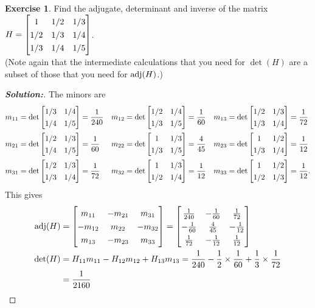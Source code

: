 \documentclass[a4paper]{amsart}
\theoremstyle{definition}
\newtheorem{exercise}{Exercise}
\newenvironment{solution}{\begin{proof}[\textbf{Solution:}] \vphantom{u}}{\end{proof}}
\begin{document}
\begin{exercise}\label{ex-adjugate-hilbert}
 Find the adjugate, determinant and inverse of the matrix
 $H=\bbm 1&1/2&1/3 \\ 1/2&1/3&1/4 \\ 1/3&1/4&1/5 \ebm$.  \\
 (Note again that the intermediate calculations that you need for
 $\det(H)$ are a subset of those that you need for $\operatorname{adj}(H)$.)
\end{exercise}
\begin{solution}
 The minors are 
 \begin{align*}
  m_{11} &= \det\bbm 1/3&1/4 \\ 1/4&1/5 \ebm = \frac{1}{240} &
  m_{12} &= \det\bbm 1/2&1/4 \\ 1/3&1/5 \ebm = \frac{1}{60} &
  m_{13} &= \det\bbm 1/2&1/3 \\ 1/3&1/4 \ebm = \frac{1}{72} \\
  m_{21} &= \det\bbm 1/2&1/3 \\ 1/4&1/5 \ebm = \frac{1}{60} &
  m_{22} &= \det\bbm 1  &1/3 \\ 1/3&1/5 \ebm = \frac{4}{45} &
  m_{23} &= \det\bbm 1  &1/2 \\ 1/3&1/4 \ebm = \frac{1}{12} \\
  m_{31} &= \det\bbm 1/2&1/3 \\ 1/3&1/4 \ebm = \frac{1}{72} &
  m_{32} &= \det\bbm 1  &1/3 \\ 1/2&1/4 \ebm = \frac{1}{12} &
  m_{33} &= \det\bbm 1  &1/2 \\ 1/2&1/3 \ebm = \frac{1}{12}.
 \end{align*}
 This gives
 \begin{align*} 
  \adj(H) &= \bbm  m_{11} & -m_{21} &  m_{31} \\
                  -m_{12} &  m_{22} & -m_{32} \\
                   m_{13} & -m_{23} &  m_{33} \ebm 
           = \renewcommand{\arraystretch}{1.3} \bbm 
                   \frac{1}{240} & -\frac{1}{60} & \frac{1}{72} \\
                  -\frac{1}{60} &  \frac{4}{45} & -\frac{1}{12} \\
                   \frac{1}{72} & -\frac{1}{12} &  \frac{1}{12} \ebm
                   \\
  \det(H) &= H_{11}m_{11} - H_{12}m_{12} + H_{13}m_{13} 
           = \frac{1}{240} - \frac{1}{2}\tm\frac{1}{60} +
             \frac{1}{3}\tm\frac{1}{72} \\
          &= \frac{1}{2160} \\

\end{align*}
\end{solution}
\end{document}
